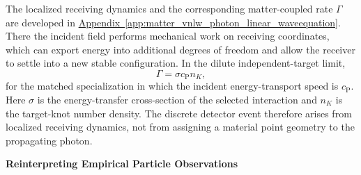 The localized receiving dynamics and the corresponding matter-coupled rate $\Gamma$ are developed in
\hyperref[app:matter_vnlw_photon_linear_waveequation]{Appendix~\ref*{app:matter_vnlw_photon_linear_waveequation}}. There the incident field performs mechanical work on receiving coordinates, which can export energy into additional degrees of freedom and allow the receiver to settle into a new stable configuration. In the dilute independent-target limit,
\begin{equation}
    \Gamma
    =
    \sigma c_{\mathrm P} n_K,
\end{equation}
for the matched specialization in which the incident energy-transport speed is $c_{\mathrm P}$. Here $\sigma$ is the energy-transfer cross-section of the selected interaction and $n_K$ is the target-knot number density. The discrete detector event therefore arises from localized receiving dynamics, not from assigning a material point geometry to the propagating photon.

\vspace{0.5em}
\noindent\textbf{Reinterpreting Empirical Particle Observations}

